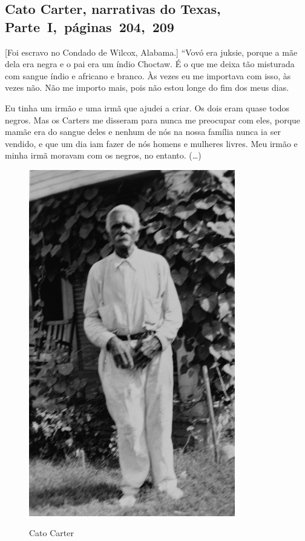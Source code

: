 \subsection{Cato Carter, narrativas do Texas, Parte~I,~páginas~204,~209} \label{ref52}

{[}Foi escravo no Condado de Wilcox, Alabama.{]} ``Vovó era juksie, porque a mãe dela era negra e o pai era um índio
Choctaw. É o que me deixa tão misturada com sangue índio e africano e
branco. Às vezes eu me importava com isso, às vezes não. Não me importo
mais, pois não estou longe do fim dos meus dias.

Eu tinha um irmão e uma irmã que ajudei a criar. Os dois eram quase
todos negros. Mas os Carters me disseram para nunca me preocupar com
eles, porque mamãe era do sangue deles e nenhum de nós na nossa família
nunca ia ser vendido, e que um dia iam fazer de nós homens e mulheres
livres. Meu irmão e minha irmã moravam com os negros, no entanto.
(\ldots{})

\pagebreak
\thispagestyle{empty}
\begin{figure}[!ht]
\centering
 \includegraphics[width=90mm]{./imgs/catocarter_recorte.jpg} \label{img10}
\caption{Cato Carter}
\end{figure}

